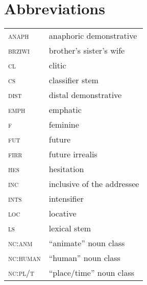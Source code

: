 \documentclass[output=paper,nonflat,colorlinks,citecolor=brown]{langsci/langscibook}
\begin{document}
\section*{Abbreviations}

\begin{tabularx}{.49\textwidth}{>{\scshape}lQ}
anaph& anaphoric demonstrative               \\
brziwi& brother’s sister’s wife              \\
cl& clitic                                   \\
cs& classifier stem                          \\
dist& distal demonstrative                   \\
emph& emphatic                               \\
f& feminine                                  \\
fut& future                                  \\
firr& future irrealis                        \\
hes& hesitation                              \\
inc& inclusive of the addressee              \\
ints& intensifier                            \\
loc& locative                                \\
ls& lexical stem                             \\
nc:anm& “animate” noun class                 \\
nc:human& “human” noun class                 \\
nc:pl/t& “place/time” noun class             \\
\end{tabularx}
\end{document}

